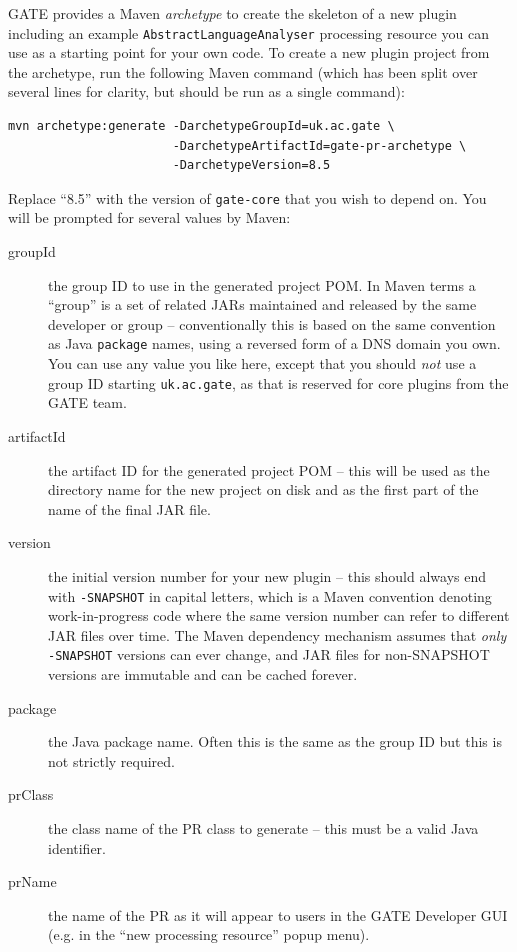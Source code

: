 GATE provides a Maven \emph{archetype} to create the skeleton of a new plugin
including an example \texttt{AbstractLanguageAnalyser} processing resource you
can use as a starting point for your own code.
To create a new plugin project from the archetype, run the following Maven
command (which has been split over several lines for clarity, but should be run
as a single command):
\begin{verbatim}
mvn archetype:generate -DarchetypeGroupId=uk.ac.gate \
                       -DarchetypeArtifactId=gate-pr-archetype \
                       -DarchetypeVersion=8.5
\end{verbatim}
Replace ``8.5'' with the version of \texttt{gate-core} that you wish to depend
on.  You will be prompted for several values by Maven:
\begin{description}
\item[groupId] the group ID to use in the generated project POM. In Maven terms
  a ``group'' is a set of related JARs maintained and released by the same
  developer or group -- conventionally this is based on the same convention as
  Java \texttt{package} names, using a reversed form of a DNS domain you own.
  You can use any value you like here, except that you should \emph{not} use
  a group ID starting \texttt{uk.ac.gate}, as that is reserved for core plugins
  from the GATE team.
\item[artifactId] the artifact ID for the generated project POM -- this will be
  used as the directory name for the new project on disk and as the first part
  of the name of the final JAR file.
\item[version] the initial version number for your new plugin -- this should
  always end with \verb!-SNAPSHOT! in capital letters, which is a Maven
  convention denoting work-in-progress code where the same version number can
  refer to different JAR files over time.  The Maven dependency mechanism
  assumes that \emph{only} \verb!-SNAPSHOT! versions can ever change, and
  JAR files for non-SNAPSHOT versions are immutable and can be cached forever.
\item[package] the Java package name.  Often this is the same as the group ID
  but this is not strictly required.
\item[prClass] the class name of the PR class to generate -- this must be a
  valid Java identifier.
\item[prName] the name of the PR as it will appear to users in the GATE
  Developer GUI (e.g. in the ``new processing resource'' popup menu).
\end{description}

